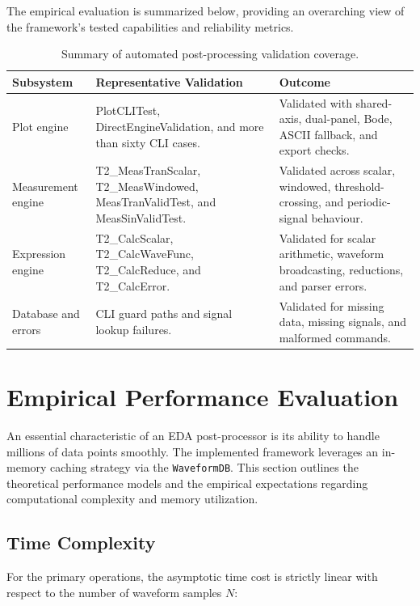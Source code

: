 The empirical evaluation is summarized below, providing an overarching view of the framework's tested capabilities and reliability metrics.

\begin{table}[H]
\centering
\caption{Summary of automated post-processing validation coverage.}
\label{tab:validation-summary}
\small
\begin{tabularx}{\textwidth}{p{3.1cm} p{5cm} X}
\toprule
\textbf{Subsystem} & \textbf{Representative Validation} & \textbf{Outcome} \\
\midrule
Plot engine & PlotCLITest, DirectEngineValidation, and more than sixty CLI cases. & Validated with shared-axis, dual-panel, Bode, ASCII fallback, and export checks. \\
Measurement engine & T2\_MeasTranScalar, T2\_MeasWindowed, MeasTranValidTest, and MeasSinValidTest. & Validated across scalar, windowed, threshold-crossing, and periodic-signal behaviour. \\
Expression engine & T2\_CalcScalar, T2\_CalcWaveFunc, T2\_CalcReduce, and T2\_CalcError. & Validated for scalar arithmetic, waveform broadcasting, reductions, and parser errors. \\
Database and errors & CLI guard paths and signal lookup failures. & Validated for missing data, missing signals, and malformed commands. \\
\bottomrule
\end{tabularx}
\end{table}

\section{Empirical Performance Evaluation}
\label{sec:pp-performance}

An essential characteristic of an EDA post-processor is its ability to handle millions of data points smoothly. The implemented framework leverages an in-memory caching strategy via the \texttt{WaveformDB}. This section outlines the theoretical performance models and the empirical expectations regarding computational complexity and memory utilization.

\subsection{Time Complexity}

For the primary operations, the asymptotic time cost is strictly linear with respect to the number of waveform samples $N$:

